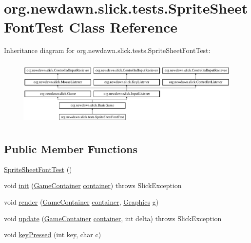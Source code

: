 \hypertarget{classorg_1_1newdawn_1_1slick_1_1tests_1_1_sprite_sheet_font_test}{}\section{org.\+newdawn.\+slick.\+tests.\+Sprite\+Sheet\+Font\+Test Class Reference}
\label{classorg_1_1newdawn_1_1slick_1_1tests_1_1_sprite_sheet_font_test}
Inheritance diagram for org.\+newdawn.\+slick.\+tests.\+Sprite\+Sheet\+Font\+Test\+:\begin{figure}[H]
\begin{center}
\leavevmode
\includegraphics[height=3.444035cm]{classorg_1_1newdawn_1_1slick_1_1tests_1_1_sprite_sheet_font_test}
\end{center}
\end{figure}
\subsection*{Public Member Functions}
\begin{DoxyCompactItemize}
\item 
\mbox{\hyperlink{classorg_1_1newdawn_1_1slick_1_1tests_1_1_sprite_sheet_font_test_adf11cf3193647a23114886b5963e6616}{Sprite\+Sheet\+Font\+Test}} ()
\item 
void \mbox{\hyperlink{classorg_1_1newdawn_1_1slick_1_1tests_1_1_sprite_sheet_font_test_ac0db7d20128ed1f4d1a2363e37a44494}{init}} (\mbox{\hyperlink{classorg_1_1newdawn_1_1slick_1_1_game_container}{Game\+Container}} \mbox{\hyperlink{classorg_1_1newdawn_1_1slick_1_1tests_1_1_sprite_sheet_font_test_a815648868b0f6ece0eb2952a1faeaedf}{container}})  throws Slick\+Exception 
\item 
void \mbox{\hyperlink{classorg_1_1newdawn_1_1slick_1_1tests_1_1_sprite_sheet_font_test_ae5d38e883f23a0c129f0138eaa90af3e}{render}} (\mbox{\hyperlink{classorg_1_1newdawn_1_1slick_1_1_game_container}{Game\+Container}} \mbox{\hyperlink{classorg_1_1newdawn_1_1slick_1_1tests_1_1_sprite_sheet_font_test_a815648868b0f6ece0eb2952a1faeaedf}{container}}, \mbox{\hyperlink{classorg_1_1newdawn_1_1slick_1_1_graphics}{Graphics}} g)
\item 
void \mbox{\hyperlink{classorg_1_1newdawn_1_1slick_1_1tests_1_1_sprite_sheet_font_test_a620ff32ef08af29724e0aa7e35889008}{update}} (\mbox{\hyperlink{classorg_1_1newdawn_1_1slick_1_1_game_container}{Game\+Container}} \mbox{\hyperlink{classorg_1_1newdawn_1_1slick_1_1tests_1_1_sprite_sheet_font_test_a815648868b0f6ece0eb2952a1faeaedf}{container}}, int delta)  throws Slick\+Exception 
\item 
void \mbox{\hyperlink{classorg_1_1newdawn_1_1slick_1_1tests_1_1_sprite_sheet_font_test_a3466f33cbc843894f9974697fd988e74}{key\+Pressed}} (int key, char c)
\end{DoxyCompactItemize}
